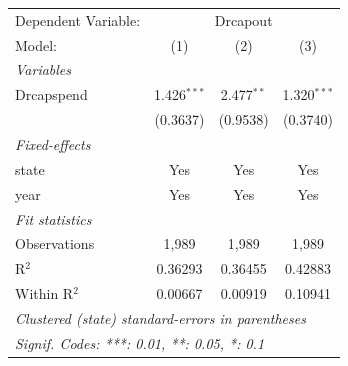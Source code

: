 
\begingroup
\centering
\begin{tabular}{lccc}
   \tabularnewline \midrule \midrule
   Dependent Variable: & \multicolumn{3}{c}{Drcapout}\\
   Model:       & (1)           & (2)          & (3)\\  
   \midrule
   \emph{Variables}\\
   Drcapspend   & 1.426$^{***}$ & 2.477$^{**}$ & 1.320$^{***}$\\   
                & (0.3637)      & (0.9538)     & (0.3740)\\   
   \midrule
   \emph{Fixed-effects}\\
   state        & Yes           & Yes          & Yes\\  
   year         & Yes           & Yes          & Yes\\  
   \midrule
   \emph{Fit statistics}\\
   Observations & 1,989         & 1,989        & 1,989\\  
   R$^2$        & 0.36293       & 0.36455      & 0.42883\\  
   Within R$^2$ & 0.00667       & 0.00919      & 0.10941\\  
   \midrule \midrule
   \multicolumn{4}{l}{\emph{Clustered (state) standard-errors in parentheses}}\\
   \multicolumn{4}{l}{\emph{Signif. Codes: ***: 0.01, **: 0.05, *: 0.1}}\\
\end{tabular}
\par\endgroup


